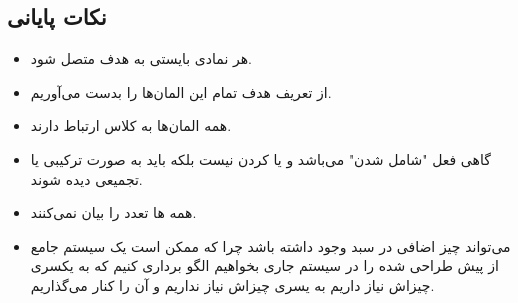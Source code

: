 \subsection{نکات پایانی}

\begin{itemize}
    \item هر نمادی بایستی به هدف متصل شود.
    \item از تعریف هدف تمام این المان‌ها را بدست می‌آوریم.
    \item همه المان‌ها به کلاس ارتباط دارند.
    \item گاهی فعل "شامل شدن" می‌باشد و  یا  کردن نیست بلکه
    باید به صورت ترکیبی یا تجمیعی دیده شوند.
    \item همه ها تعدد را بیان نمی‌کنند.
    \item می‌تواند چیز اضافی در سبد وجود داشته باشد چرا که ممکن است یک سیستم
    جامع از پیش طراحی شده را در سیستم جاری بخواهیم الگو برداری کنیم که به یکسری
    چیزاش نیاز داریم به یسری چیزاش نیاز نداریم و آن را کنار می‌گذاریم.
\end{itemize}


